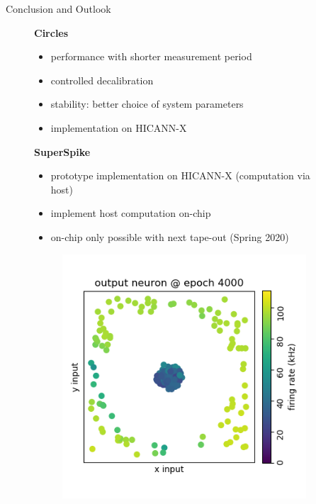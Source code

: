 \documentclass[12pt, aspectratio=169]{beamer}
\begin{document}
\begin{frame}{Conclusion and Outlook}
\begin{figure}[!htb]
        \textbf{Circles}
            \begin{itemize}
                \item performance with shorter measurement period
                \item controlled decalibration
                \item stability: better choice of system parameters
                \item implementation on HICANN-X
            \end{itemize}
        \textbf{SuperSpike}
        \begin{itemize}
            \item prototype implementation on HICANN-X (computation via host)
            \item implement host computation on-chip
            \item on-chip only possible with next tape-out (Spring 2020)
        \end{itemize}
  	\endminipage\hfill
  	\centering
        \begin{figure}
            \includegraphics[scale=0.3]{mfp/output_neuron_4000.png}
            \label{fig:my_label}
        \end{figure}
    \endminipage\hfill
\end{figure}
\end{frame}
\end{document}
